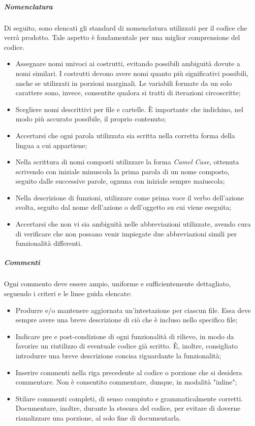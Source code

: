 			\subparagraph{Nomenclatura}
			Di seguito, sono elencati gli standard di nomenclatura utilizzati per il codice che verrà prodotto. Tale aspetto è fondamentale per una miglior comprensione del codice.
			\begin{itemize}
			\item Assegnare nomi univoci ai costrutti, evitando possibili ambiguità dovute a nomi similari. I costrutti devono avere nomi quanto più significativi possibili, anche se utilizzati in porzioni marginali. Le variabili formate da un solo carattere sono, invece, consentite qualora si tratti di iterazioni circoscritte;
			\item Scegliere nomi descrittivi per file e cartelle. \MakeUppercase{è} importante che indichino, nel modo più accurato possibile, il proprio contenuto;
			\item Accertarsi che ogni parola utilizzata sia scritta nella corretta forma della lingua a cui appartiene;
			\item Nella scrittura di nomi composti utilizzare la forma \textit{Camel Case}, ottenuta scrivendo con iniziale minuscola la prima parola di un nome composto, seguito dalle successive parole, ognuna con iniziale sempre maiuscola;
			\item Nella descrizione di funzioni, utilizzare come prima voce il verbo dell'azione svolta, seguito dal nome dell'azione o dell'oggetto su cui viene eseguita;
			\item Accertarsi che non vi sia ambiguità nelle abbreviazioni utilizzate, avendo cura di verificare che non possano venir impiegate due abbreviazioni simili per funzionalità differenti.
			\end{itemize}
			
			\subparagraph{Commenti}
			Ogni commento deve essere ampio, uniforme e sufficientemente dettagliato, seguendo i criteri e le linee guida elencate:
			\begin{itemize}
			\item Produrre e/o mantenere aggiornata un'intestazione per ciascun file. Essa deve sempre avere una breve descrizione di ciò che è incluso nello specifico file;
			\item Indicare pre e post-condizione di ogni funzionalità di rilievo, in modo da favorire un riutilizzo di eventuale codice già scritto. \MakeUppercase{è}, inoltre, consigliato introdurre una breve descrizione concisa riguardante la funzionalità;
			\item Inserire commenti nella riga precedente al codice o porzione che si desidera commentare. Non è consentito commentare, dunque, in modalità "inline";
			\item Stilare commenti completi, di senso compiuto e grammaticalmente corretti. Documentare, inoltre, durante la stesura del codice, per evitare di doverne rianalizzare una porzione, al solo fine di documentarla.
			\end{itemize}
		
